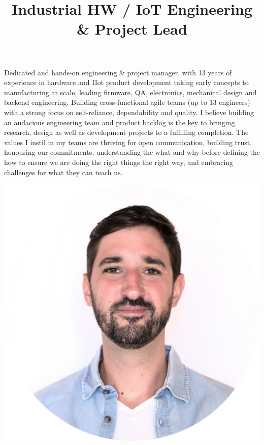 \documentclass[10pt,a4paper]{moderncv}
\title{Industrial HW / IoT Engineering \& Project Lead}
\begin{document}
\makecvhead

\vspace{2em}


\vspace{0.5em}
\begin{minipage}{0.80\textwidth}
  Dedicated and hands-on engineering \& project manager, with 13 years of experience in hardware and IIot product development taking early concepts to manufacturing at scale, leading firmware, QA, electronics, mechanical design and backend engineering. Building cross-functional agile teams (up to 13 engineers) with a strong focus on self-reliance, dependability and quality. I believe building an audacious engineering team and product backlog is the key to bringing research, design as well as development projects to a fulfilling completion. The values I instil in my teams are thriving for open communication, building trust, honouring our commitments, understanding the what and why before defining the how to ensure we are doing the right things the right way, and embracing challenges for what they can teach us.
\end{minipage}
\hfill
\begin{minipage}{0.18\textwidth}
  \includegraphics[width=\linewidth]{portrait_round.jpg}\vspace{1.1em}
\end{minipage}
\end{document}
